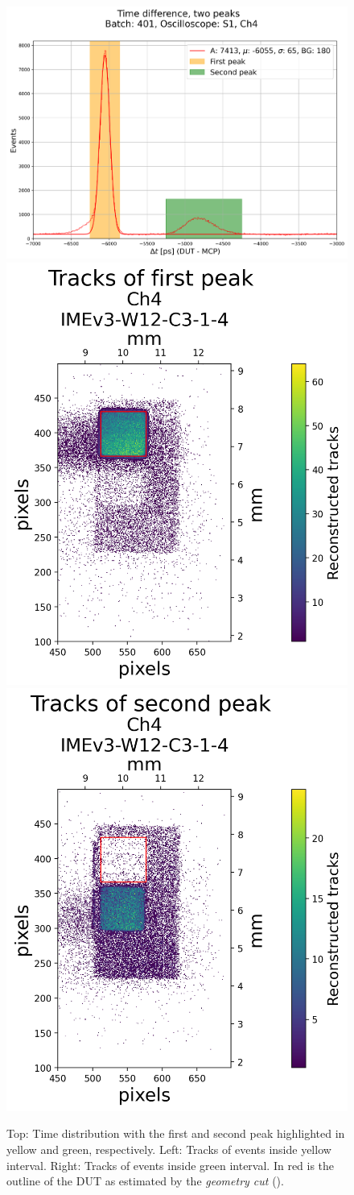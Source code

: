 \begin{figure}[h!tbp]
    \centering
    \includegraphics[width=.6\linewidth]{Images/detailed_analysis/time_difference_401_S1_dut_3_with_both_peaks_simple.png}
    \\ [\smallskipamount]
    \includegraphics[width=.47\linewidth]{Images/detailed_analysis/2D Tracks 401_S1_dut_3_with_first_peak.png}
    \hfill
    \includegraphics[width=.47\linewidth]{Images/detailed_analysis/2D Tracks 401_S1_dut_3_with_second_peak.png}
    \captionsetup{width=\captionwidth}
    \caption{Top: Time distribution with the first and second peak highlighted in yellow and green, respectively.
    Left: Tracks of events inside yellow interval.
    Right: Tracks of events inside green interval. In red is the outline of the DUT as estimated by the \textit{geometry cut} ().}
    \label{fig:time_difference_multiple_peaks_highlight}
\end{figure}

